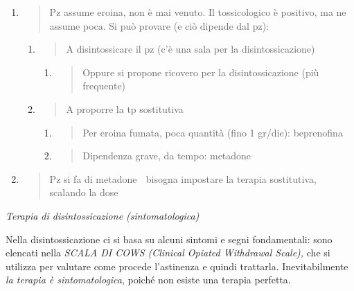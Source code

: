 \documentclass[]{article}
\begin{document}
\begin{enumerate}
\def\labelenumi{\arabic{enumi}.}
\item
  \begin{quote}
  Pz assume eroina, non è mai venuto. Il tossicologico è positivo, ma ne
  assume poca. Si può provare (e ciò dipende dal pz):
  \end{quote}

  \begin{enumerate}
  \def\labelenumii{\alph{enumii}.}
  \item
    \begin{quote}
    A disintossicare il pz (c'è una sala per la disintossicazione)
    \end{quote}

    \begin{enumerate}
    \def\labelenumiii{\roman{enumiii}.}
    \item
      \begin{quote}
      Oppure si propone ricovero per la disintossicazione (più
      frequente)
      \end{quote}
    \end{enumerate}
  \item
    \begin{quote}
    A proporre la tp sostitutiva
    \end{quote}

    \begin{enumerate}
    \def\labelenumiii{\roman{enumiii}.}
    \item
      \begin{quote}
      Per eroina fumata, poca quantità (fino 1 gr/die): beprenofina
      \end{quote}
    \item
      \begin{quote}
      Dipendenza grave, da tempo: metadone
      \end{quote}
    \end{enumerate}
  \end{enumerate}
\item
  \begin{quote}
  Pz si fa di metadone  bisogna impostare la terapia sostitutiva,
  scalando la dose
  \end{quote}
\end{enumerate}

\emph{Terapia di disintossicazione (sintomatologica)}

Nella disintossicazione ci si basa su alcuni sintomi e segni
fondamentali: sono elencati nella \emph{SCALA DI COWS (Clinical Opiated
Withdrawal Scale),} che si utilizza per valutare come procede
l'astinenza e quindi trattarla. Inevitabilmente \emph{la terapia è
sintomatologica}, poiché non esiste una terapia perfetta.
\end{document}
